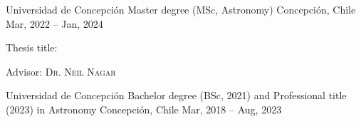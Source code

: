 
\begin{cventries}

  \cventry
    {Universidad de Concepción}
    {Master degree (MSc, Astronomy)}
    {Concepción, Chile}
    {Mar, 2022 -- Jan, 2024}
    {
      \begin{cvitems}
        \item{Thesis title: }
        \item{Advisor: \textsc{Dr. Neil Nagar}}
      \end{cvitems}
      \vspace{1em}
    }
  \cventry
    {Universidad de Concepción}
    {Bachelor degree (BSc, 2021) and Professional title (2023) in Astronomy}
    {Concepción, Chile}
    {Mar, 2018 -- Aug, 2023}
    {}

\end{cventries}
